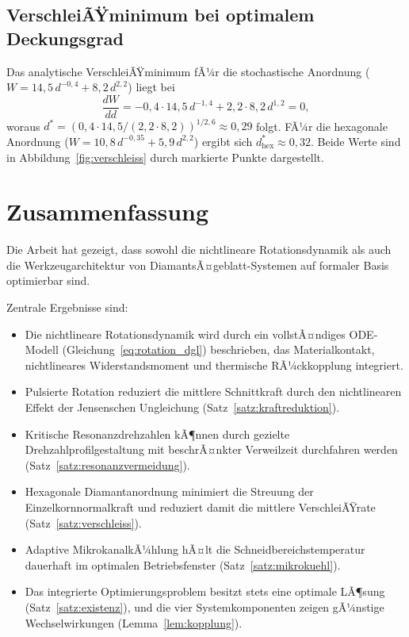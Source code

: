﻿\documentclass[a4paper,12pt]{article}
\theoremstyle{definition}
\begin{document}
\subsection{VerschleiÃŸminimum bei optimalem Deckungsgrad}

Das analytische VerschleiÃŸminimum fÃ¼r die stochastische Anordnung ($W = 14{,}5\,d^{-0{,}4} + 8{,}2\,d^{2{,}2}$)
liegt bei
\[
\frac{dW}{dd} = -0{,}4\cdot 14{,}5\,d^{-1{,}4} + 2{,}2\cdot 8{,}2\,d^{1{,}2} = 0,
\]
woraus $d^* = (0{,}4\cdot 14{,}5/(2{,}2\cdot 8{,}2))^{1/2{,}6} \approx 0{,}29$ folgt.
FÃ¼r die hexagonale Anordnung ($W = 10{,}8\,d^{-0{,}35} + 5{,}9\,d^{2{,}2}$) ergibt sich
$d^*_{\mathrm{hex}} \approx 0{,}32$. Beide Werte sind in Abbildung~\ref{fig:verschleiss}
durch markierte Punkte dargestellt.

\section{Zusammenfassung}

Die Arbeit hat gezeigt, dass sowohl die nichtlineare Rotationsdynamik als auch
die Werkzeugarchitektur von DiamantsÃ¤geblatt-Systemen auf formaler Basis
optimierbar sind.

Zentrale Ergebnisse sind:
\begin{itemize}
\item Die nichtlineare Rotationsdynamik wird durch ein vollstÃ¤ndiges ODE-Modell
      (Gleichung~\eqref{eq:rotation_dgl}) beschrieben, das Materialkontakt, nichtlineares
      Widerstandsmoment und thermische RÃ¼ckkopplung integriert.
\item Pulsierte Rotation reduziert die mittlere Schnittkraft durch den nichtlinearen
      Effekt der Jensenschen Ungleichung (Satz~\ref{satz:kraftreduktion}).
\item Kritische Resonanzdrehzahlen kÃ¶nnen durch gezielte Drehzahlprofilgestaltung
      mit beschrÃ¤nkter Verweilzeit durchfahren werden (Satz~\ref{satz:resonanzvermeidung}).
\item Hexagonale Diamantanordnung minimiert die Streuung der Einzelkornnormalkraft
      und reduziert damit die mittlere VerschleiÃŸrate (Satz~\ref{satz:verschleiss}).
\item Adaptive MikrokanalkÃ¼hlung hÃ¤lt die Schneidbereichstemperatur dauerhaft im
      optimalen Betriebsfenster (Satz~\ref{satz:mikrokuehl}).
\item Das integrierte Optimierungsproblem besitzt stets eine optimale LÃ¶sung
      (Satz~\ref{satz:existenz}), und die vier Systemkomponenten zeigen gÃ¼nstige
      Wechselwirkungen (Lemma~\ref{lem:kopplung}).
\end{itemize}
\end{document}
